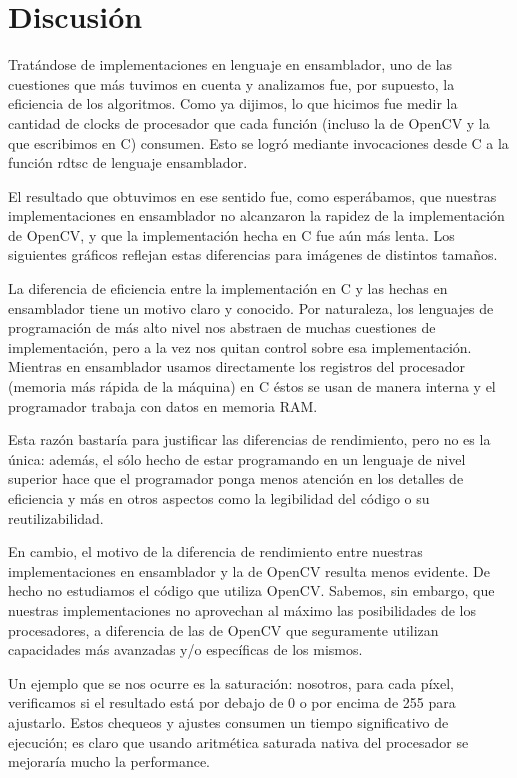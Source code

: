 \section{Discusión}

Tratándose de implementaciones en lenguaje en ensamblador, uno de las cuestiones que más tuvimos en cuenta y analizamos fue, por supuesto, la eficiencia de los algoritmos. Como ya dijimos, lo que hicimos fue medir la cantidad de clocks de procesador que cada función (incluso la de OpenCV y la que escribimos en C) consumen. Esto se logró mediante invocaciones desde C a la función rdtsc de lenguaje ensamblador.

El resultado que obtuvimos en ese sentido fue, como esperábamos, que nuestras implementaciones en ensamblador no alcanzaron la rapidez de la implementación de OpenCV, y que la implementación hecha en C fue aún más lenta. Los siguientes gráficos reflejan estas diferencias para imágenes de distintos tamaños.


La diferencia de eficiencia entre la implementación en C y las hechas en ensamblador tiene un motivo claro y conocido. Por naturaleza, los lenguajes de programación de más alto nivel nos abstraen de muchas cuestiones de implementación, pero a la vez nos quitan control sobre esa implementación. Mientras en ensamblador usamos directamente los registros del procesador (memoria más rápida de la máquina) en C éstos se usan de manera interna y el programador trabaja con datos en memoria RAM.

Esta razón bastaría para justificar las diferencias de rendimiento, pero no es la única: además, el sólo hecho de estar programando en un lenguaje de nivel superior hace que el programador ponga menos atención en los detalles de eficiencia y más en otros aspectos como la legibilidad del código o su reutilizabilidad.

En cambio, el motivo de la diferencia de rendimiento entre nuestras implementaciones en ensamblador y la de OpenCV resulta menos evidente. De hecho no estudiamos el código que utiliza OpenCV. Sabemos, sin embargo, que nuestras implementaciones no aprovechan al máximo las posibilidades de los procesadores, a diferencia de las de OpenCV que seguramente utilizan capacidades más avanzadas y/o específicas de los mismos.

Un ejemplo que se nos ocurre es la saturación: nosotros, para cada píxel, verificamos si el resultado está por debajo de 0 o por encima de 255 para ajustarlo. Estos chequeos y ajustes consumen un tiempo significativo de ejecución; es claro que usando aritmética saturada nativa del procesador se mejoraría mucho la performance.

